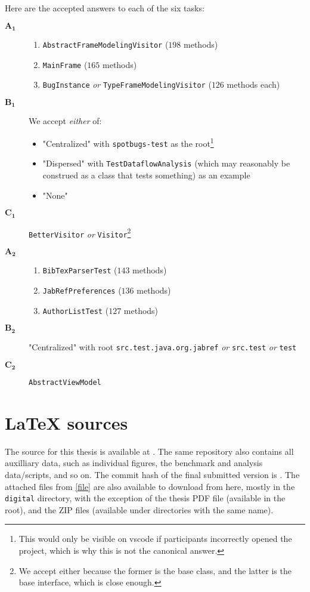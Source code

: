 Here are the accepted answers to each of the six tasks:
\begin{description}
	\item[$\bm{A_1}$]
	      \begin{enumerate}
		      \item \texttt{AbstractFrameModelingVisitor} ($198$ methods)
		      \item \texttt{MainFrame} ($165$ methods)
		      \item \texttt{BugInstance} \emph{or} \texttt{TypeFrameModelingVisitor} ($126$ methods each)
	      \end{enumerate}
	\item[$\bm{B_1}$] We accept \emph{either} of:
	      \begin{itemize}
		      \item "Centralized" with \texttt{spotbugs-test} as the root\footnote{
			            This would only be visible on \gls{vscode} if participants incorrectly opened the project, which is why this is not the canonical answer.
		            }
		      \item "Dispersed" with \texttt{TestDataflowAnalysis} (which may reasonably be construed as a class that tests something) as an example
		      \item "None"
	      \end{itemize}
	\item[$\bm{C_1}$] \texttt{BetterVisitor} \emph{or} \texttt{Visitor}\footnote{
		      We accept either because the former is the base class, and the latter is the base interface, which is close enough.
	      }
	\item[$\bm{A_2}$]
	      \begin{enumerate}
		      \item \texttt{BibTexParserTest} ($143$ methods)
		      \item \texttt{JabRefPreferences} ($136$ methods)
		      \item \texttt{AuthorListTest} ($127$ methods)
	      \end{enumerate}
	\item[$\bm{B_2}$] "Centralized" with root \texttt{src.test.java.org.jabref} \emph{or} \texttt{src.test} \emph{or} \texttt{test}
	\item[$\bm{C_2}$] \texttt{AbstractViewModel}
\end{description}

\section{\LaTeX{} sources}\label{app:source}
The source for this thesis is available at .
The same repository also contains all auxilliary data, such as individual figures, the benchmark and analysis data/scripts, and so on.
The commit hash of the final submitted version is .
The attached files from \cref{file} are also available to download from here, mostly in the \texttt{digital} directory, with the exception of the thesis PDF file (available in the root), and the ZIP files (available under directories with the same name).
